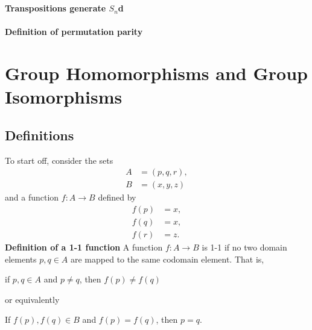 \documentclass[12 pt]{article}
\numberwithin{equation}{section}
\begin{document}
\
\\
\\
\textbf{Transpositions generate $S_n$d}
\
\\
\\
\textbf{Definition of permutation parity}














\section{Group Homomorphisms and Group Isomorphisms}






\subsection{Definitions}
To start off, consider the sets \begin{align*}
A & = (p,q,r), \\
B & = (x,y,z)
\end{align*}
and a function $f: A \rightarrow B$ defined by \begin{align*}
f(p) & = x, \\
f(q) & = x, \\
f(r) & = z.
\end{align*}
\textbf{Definition of a 1-1 function}
A function $f: A \rightarrow B$ is 1-1 if no two domain elements $p,q \in A$ are mapped to the same codomain element. That is, \begin{center}
if $p, q \in A$ and $p \neq q$, then $f(p) \neq f(q)$
\end{center}
or equivalently
\begin{center}
If $f(p), f(q) \in B$ and $f(p) = f(q)$, then $p = q$.
\end{center}
\end{document}
